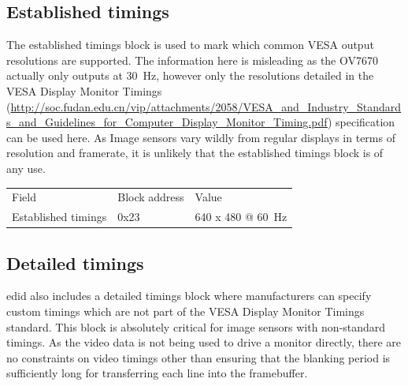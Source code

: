 \subsection{Established timings}
The established timings block is used to mark which common VESA output resolutions are supported. The information here is misleading as the OV7670 actually only outputs at \SI{30}{\hertz}, however only the resolutions detailed in the VESA Display Monitor Timings (\url{http://soc.fudan.edu.cn/vip/attachments/2058/VESA_and_Industry_Standards_and_Guidelines_for_Computer_Display_Monitor_Timing.pdf}) specification can be used here. As Image sensors vary wildly from regular displays in terms of resolution and framerate, it is unlikely that the established timings block is of any use.

\begin{table}
    \begin{tabular}{lll}
        Field               & Block address             & Value                         \\
        Established timings & 0x23                      & 640 x 480 @ \SI{60}{\hertz}   \\
    \end{tabular}
\end{table}

\subsection{Detailed timings}
\Gls{edid} also includes a detailed timings block where manufacturers can specify custom timings which are not part of the VESA Display Monitor Timings standard. This block is absolutely critical for image sensors with non-standard timings. As the video data is not being used to drive a monitor directly, there are no constraints on video timings other than ensuring that the blanking period is sufficiently long for transferring each line into the framebuffer.

